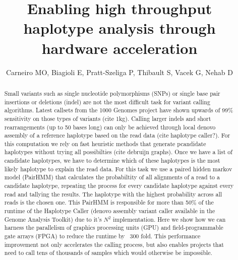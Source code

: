 \documentclass[11pt]{article}
\title{Enabling high throughput haplotype analysis through hardware acceleration}
\author{Carneiro MO, Biagioli E, Pratt-Szeliga P, Thibault S, Vacek G, Nehab D}
\begin{document}
	\maketitle
	
	\begin{abstract}
	Small variants such as single nucleotide polymorphisms (SNPs) or single base pair insertions or deletions (indel) are not the most difficult task for variant calling algorithms. Latest callsets from the 1000 Genomes project have shown upwards of 99\% sensitivity on those types of variants (cite 1kg). Calling larger indels and short rearrangements (up to 50 bases long) can only be achieved through local denovo assembly of a reference haplotype based on the read data (cite haplotype caller?). For this computation we rely on fast heuristic methods that generate pcandidate haplotypes without trying all possibilties (cite debruijn graphs). Once we have a list of candidate haplotypes, we have to determine which of these haplotypes is the most likely haplotype to explain the read data. For this task we use a paired hidden markov model (PairHMM) that calculates the probabiltity of all alignments of a read to a candidate haplotype, repeating the process for every candidate haplotype against every read and tallying the results. The haplotype with the highest probability across all reads is the chosen one. This PairHMM is responsible for more than 50\% of the runtime of the Haplotype Caller (denovo assembly variant caller available in the Genome Analysis Toolkit) due to it's $N^2$ implementation. Here we show how we can harness the parallelism of graphics processing units (GPU) and field-programmable gate arrays (FPGA) to reduce the runtime by ~300 fold. This performance improvement not only accelerates the calling process, but also enables projects that need to call tens of thousands of samples which would otherwise be impossible.
	\end{abstract}
\end{document}
